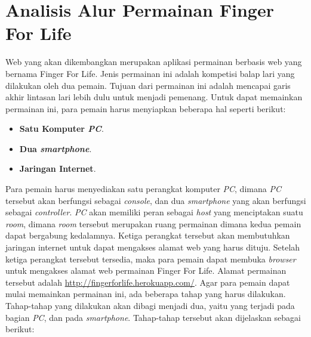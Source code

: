 \section{Analisis Alur Permainan Finger For Life}
\label{alur}

Web yang akan dikembangkan merupakan aplikasi permainan berbasis web yang bernama Finger For Life. Jenis permainan ini adalah kompetisi balap lari yang dilakukan oleh dua pemain. Tujuan dari permainan ini adalah mencapai garis akhir lintasan lari lebih dulu untuk menjadi pemenang. Untuk dapat memainkan permainan ini, para pemain harus menyiapkan beberapa hal seperti berikut:

\begin{itemize}
	\item \textbf{Satu Komputer \textit{PC}}.
	\item \textbf{Dua \textit{smartphone}}.
	\item \textbf{Jaringan Internet}.
\end{itemize}

Para pemain harus menyediakan satu perangkat komputer \textit{PC}, dimana \textit{PC} tersebut akan berfungsi sebagai \textit{console}, dan dua \textit{smartphone} yang akan berfungsi sebagai \textit{controller}. \textit{PC} akan memiliki peran sebagai \textit{host} yang menciptakan suatu \textit{room}, dimana \textit{room} tersebut merupakan ruang permainan dimana kedua pemain dapat bergabung kedalamnya. Ketiga perangkat tersebut akan membutuhkan jaringan internet untuk dapat mengakses alamat web yang harus dituju. Setelah ketiga perangkat tersebut tersedia, maka para pemain dapat membuka \textit{browser} untuk mengakses alamat web permainan Finger For Life. Alamat permainan tersebut adalah \url{http://fingerforlife.herokuapp.com/}. Agar para pemain dapat mulai memainkan permainan ini, ada beberapa tahap yang harus dilakukan. Tahap-tahap yang dilakukan akan dibagi menjadi dua, yaitu yang terjadi pada bagian \textit{PC}, dan pada \textit{smartphone}. Tahap-tahap tersebut akan dijelaskan sebagai berikut:

